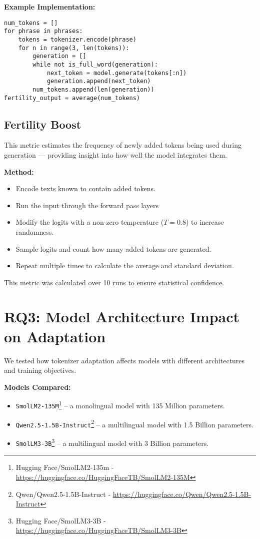 \textbf{Example Implementation:}
\begin{lstlisting}
num_tokens = []
for phrase in phrases:
    tokens = tokenizer.encode(phrase)
    for n in range(3, len(tokens)):
        generation = []
        while not is_full_word(generation):
            next_token = model.generate(tokens[:n])
            generation.append(next_token)
        num_tokens.append(len(generation))
fertility_output = average(num_tokens)
\end{lstlisting}

\subsection*{\textbf{Fertility Boost}}
\label{subsec:fertility_boost}

This metric estimates the frequency of newly added tokens being used during generation — providing insight into how well the model integrates them.

\textbf{Method:}
\begin{itemize}
    \item Encode texts known to contain added tokens.
    \item Run the input through the forward pass layers
    \item Modify the logits with a non-zero temperature ($T=0.8$) to increase randomness.
    \item Sample logits and count how many added tokens are generated.
    \item Repeat multiple times to calculate the average and standard deviation.
\end{itemize}

This metric was calculated over 10 runs to ensure statistical confidence.

\section{RQ3: Model Architecture Impact on Adaptation}
\label{sec:model_impact}

We tested how tokenizer adaptation affects models with different architectures and training objectives.

\textbf{Models Compared:}
\begin{itemize}
    \item \texttt{SmolLM2-135M}\footnote{Hugging Face/SmolLM2-135m - \url{https://huggingface.co/HuggingFaceTB/SmolLM2-135M}} – a monolingual model with 135 Million parameters.
    \item \texttt{Qwen2.5-1.5B-Instruct}\footnote{Qwen/Qwen2.5-1.5B-Instruct - \url{https://huggingface.co/Qwen/Qwen2.5-1.5B-Instruct}} – a multilingual model with 1.5 Billion parameters.
    \item \texttt{SmolLM3-3B}\footnote{Hugging Face/SmolLM3-3B - \url{https://huggingface.co/HuggingFaceTB/SmolLM3-3B}} – a multilingual model with 3 Billion parameters.
\end{itemize}

